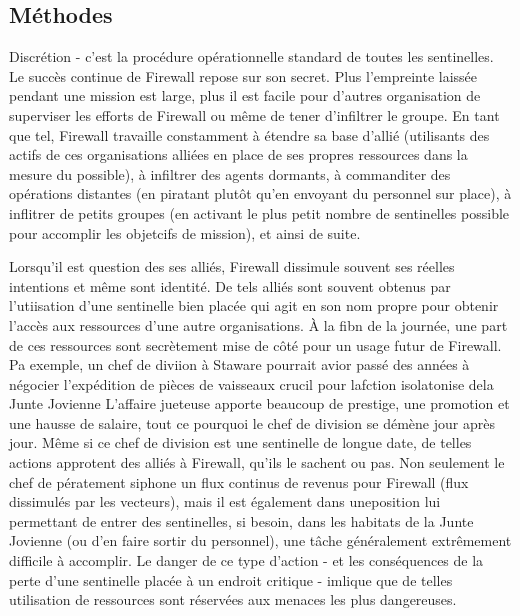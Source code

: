 






\subsection{Méthodes} 

Discrétion - c'est la procédure opérationnelle standard de toutes les sentinelles. Le succès continue de Firewall repose sur son secret. Plus l'empreinte laissée pendant une mission est large, plus il est facile pour d'autres organisation de superviser les efforts de Firewall ou même de tener d'infiltrer le groupe. En tant que tel, Firewall travaille constamment à étendre sa base d'allié (utilisants des actifs de ces organisations alliées en place de ses propres ressources dans la mesure du possible), à infiltrer des agents dormants, à commanditer des opérations distantes (en piratant plutôt qu'en envoyant du personnel sur place), à inflitrer de petits groupes (en activant le plus petit nombre de sentinelles possible pour accomplir les objetcifs de mission), et ainsi de suite. 

Lorsqu'il est question des ses alliés, Firewall dissimule souvent ses réelles intentions et même sont identité. De tels alliés sont souvent obtenus par l'utiisation d'une sentinelle bien placée qui agit en son nom propre pour obtenir l'accès aux ressources d'une autre organisations. À la fibn de la journée, une part de ces ressources sont secrètement mise de côté pour un usage futur de Firewall. Pa exemple, un chef de diviion à Staware pourrait avior passé des années à négocier l'expédition de pièces de vaisseaux crucil pour lafction isolatonise dela Junte Jovienne L'affaire jueteuse apporte beaucoup de prestige, une promotion et une hausse de salaire, tout ce pourquoi le chef de division se démène jour après jour. Même si ce chef de division est une sentinelle de longue date, de telles actions approtent des alliés à Firewall, qu'ils le sachent ou pas. Non seulement le chef de pératement siphone un flux continus de revenus pour Firewall (flux dissimulés par les vecteurs), mais il est également dans uneposition lui permettant de entrer des sentinelles, si besoin, dans les habitats de la Junte Jovienne (ou d'en faire sortir du personnel), une tâche généralement extrêmement difficile à accomplir. Le danger de ce type d'action - et les conséquences de la perte d'une sentinelle placée à un endroit critique - imlique que de telles utilisation de ressources sont réservées aux menaces les plus dangereuses. 

